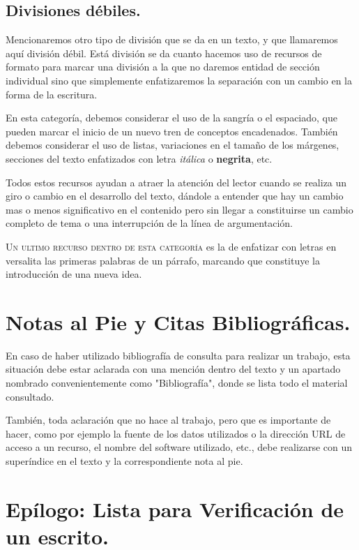 \documentclass[11pt]{article}
\begin{document}
\subsection{Divisiones débiles.}
\label{sec-4-3}

Mencionaremos otro tipo de división que se da en un texto, y que llamaremos aquí división débil.
Está división se da cuanto hacemos uso de recursos de formato para marcar una división a la que no
daremos entidad de sección individual sino que simplemente enfatizaremos la separación con un cambio
en la forma de la escritura.

En esta categoría, debemos considerar el uso de la sangría o el espaciado, que pueden marcar el inicio de un
nuevo tren de conceptos encadenados. También debemos considerar el uso de listas, variaciones en el tamaño de
los márgenes, secciones del texto enfatizados con letra \emph{itálica} o \textbf{negrita}, etc.

Todos estos recursos ayudan a atraer la atención del lector cuando se realiza un giro o cambio en el
desarrollo del texto, dándole a entender que hay un cambio mas o menos significativo en el contenido
pero sin llegar a constituirse un cambio completo de tema o una interrupción de la línea de argumentación.

\textsc{Un ultimo recurso dentro de esta categoría} es la de enfatizar con letras en versalita las primeras palabras
de un párrafo, marcando que constituye la introducción de una nueva idea.

\section{Notas al Pie y Citas Bibliográficas.}
\label{sec-5}

En caso de haber utilizado bibliografía de consulta para realizar un trabajo, esta situación debe estar
aclarada con una mención dentro del texto y un apartado nombrado convenientemente como "Bibliografía",
donde se lista todo el material consultado.

También, toda aclaración que no hace al trabajo, pero que es importante de hacer, como por ejemplo la fuente
de los datos utilizados o la dirección URL de acceso a un recurso, el nombre del software utilizado, etc.,
debe realizarse con un superíndice en el texto y la correspondiente nota al pie.

\section{Epílogo: Lista para Verificación de un escrito.}
\label{sec-6}
\end{document}
